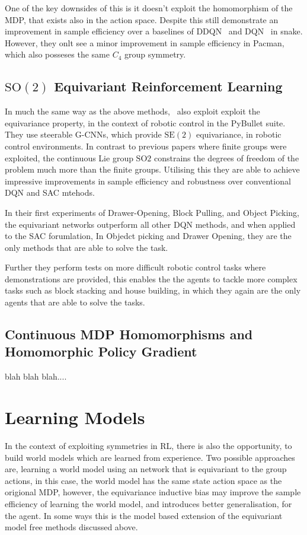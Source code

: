 One of the key downsides of this is it doesn't exploit the homomorphism of the MDP, that exists also in the action space. Despite this \cite{mondal2020group} still demonstrate an improvement in sample efficiency over a baselines of DDQN~\cite{van2016deep} and DQN~\cite{mnih2013playing} in snake. However, they onlt see a minor improvement in sample efficiency in Pacman, which also posseses the same $C_4$ group symmetry.

\subsection{$\mathrm{SO}(2)$ Equivariant Reinforcement Learning}

In much the same way as the above methods,~\cite{wang2022so2} also exploit exploit the equivariance property, in the context of robotic control in the PyBullet suite\cite{coumans2021}. They use steerable G-CNNs\cite{weiler2019general}, which provide $\text{SE}(2)$ equivariance, in robotic control environments. In contrast to previous papers where finite groups were exploited, the continuous Lie group $\text{SO}2$ constrains the degrees of freedom of the problem much more than the finite groups. Utilising this they are able to achieve impressive improvements in sample efficiency and robustness over conventional DQN and SAC mtehods.

In their first experiments of Drawer-Opening, Block Pulling, and Object Picking, the equivariant networks outperform all other DQN methods, and when applied to the SAC forumlation, In Objedct picking and Drawer Opening, they are the only methods that are able to solve the task.

Further they perform tests on more difficult robotic control tasks where demonstrations are provided, this enables the the agents to tackle more complex tasks such as block stacking and house building, in which they again are the only agents that are able to solve the tasks.

\subsection{Continuous MDP Homomorphisms and Homomorphic Policy Gradient}
blah blah blah....

\section{Learning Models}
In the context of exploiting symmetries in RL, there is also the opportunity, to build world models which are learned from experience. Two possible approaches are, learning a world model using an network that is equivariant to the group actions, in this case, the world model has the same state action space as the origional MDP, however, the equivariance inductive bias may improve the sample efficiency of learning the world model, and introduces better generalisation, for the agent. In some ways this is the model based extension of the equivariant model free methods discussed above.


